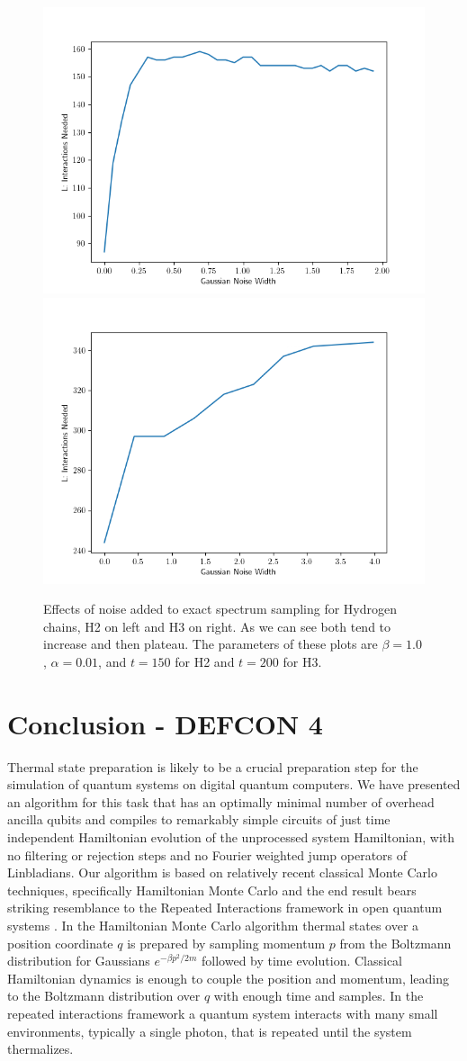 \documentclass{article}
\begin{document}
\begin{figure}
    \centering
    \includegraphics[width=0.475\linewidth]{numerics/data/h_chain_with_noise_1.png}
    \includegraphics[width=0.475\linewidth]{numerics/data/h_chain_3_with_noise_2.png}
    \caption{Effects of noise added to exact spectrum sampling for Hydrogen chains, H2 on left and H3 on right. As we can see both tend to increase and then plateau. The parameters of these plots are $\beta = 1.0$, $\alpha = 0.01$, and $t = 150$ for H2 and $t = 200$ for H3.}
    \label{fig:h_chain_with_noise}
\end{figure}

\section{Conclusion - DEFCON 4} \label{sec:conclusion}

Thermal state preparation is likely to be a crucial preparation step for the simulation of quantum systems on digital quantum computers. We have presented an algorithm for this task that has an optimally minimal number of overhead ancilla qubits and compiles to remarkably simple circuits of just time independent Hamiltonian evolution of the unprocessed system Hamiltonian, with no filtering or rejection steps and no Fourier weighted jump operators of Linbladians. Our algorithm is based on relatively recent classical Monte Carlo techniques, specifically Hamiltonian Monte Carlo \cite{hoffman2011nouturnsampleradaptivelysetting} and the end result bears striking resemblance to the Repeated Interactions framework in open quantum systems \cite{prositto2025equilibrium}. In the Hamiltonian Monte Carlo algorithm thermal states over a position coordinate $q$ is prepared by sampling momentum $p$ from the Boltzmann distribution for Gaussians $e^{-\beta p^2/2m}$ followed by time evolution. Classical Hamiltonian dynamics is enough to couple the position and momentum, leading to the Boltzmann distribution over $q$ with enough time and samples. In the repeated interactions framework a quantum system interacts with many small environments, typically a single photon, that is repeated until the system thermalizes. 
\end{document}
